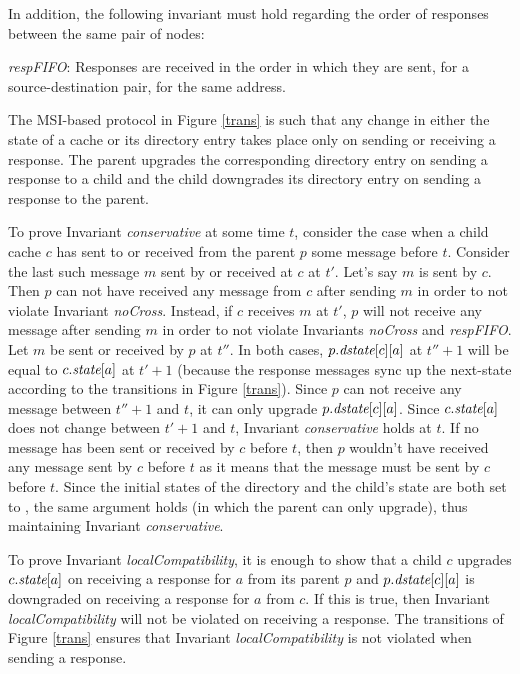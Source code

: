In addition, the following invariant must hold regarding the order of responses
between the same pair of nodes:
\begin{inv}
\textit{respFIFO}: Responses are received in the order in which they are sent,
for a source-destination pair, for the same address.
\end{inv}

The MSI-based protocol in Figure \ref{trans} is such that any change in either
the state of a cache or its directory entry takes place only on sending or
receiving a response. The parent upgrades the corresponding directory entry on
sending a response to a child and the child downgrades its directory entry on
sending a response to the parent.

To prove Invariant \textit{conservative} at some time $t$, consider the case
when a child cache $c$ has sent to or received from the parent $p$ some message
before $t$. Consider the last such message $m$ sent by or received at $c$ at
$t'$. Let's say $m$ is sent by $c$. Then $p$ can not have received any message
from $c$ after sending $m$ in order to not violate Invariant \textit{noCross}.
Instead, if $c$ receives $m$ at $t'$, $p$ will not receive any message after
sending $m$ in order to not violate Invariants \textit{noCross} and
\textit{respFIFO}. Let $m$ be sent or received by $p$ at $t''$. In both cases,
$p.\textit{dstate}[c][a]$ at $t''+1$ will be equal to $c.\textit{state}[a]$ at $t'+1$ (because
the response messages sync up the next-state according to the transitions in
Figure \ref{trans}). Since $p$ can not receive any message between $t''+1$ and
$t$, it can only upgrade $p.\textit{dstate}[c][a]$. Since $c.\textit{state}[a]$ does not change
between $t'+1$ and $t$, Invariant \textit{conservative} holds at $t$. If no
message has been sent or received by $c$ before $t$, then $p$
wouldn't have received any message sent by $c$ before $t$ as it means that the
message must be sent by $c$ before $t$. Since the initial states of the
directory and the child's state are both set to \In{}, the same argument holds
(in which the parent can only upgrade), thus maintaining Invariant
\textit{conservative}.

To prove Invariant \textit{localCompatibility}, it is enough to show that a
child $c$ upgrades $c.\textit{state}[a]$ on receiving a response for $a$ from its
parent $p$ and $p.\textit{dstate}[c][a]$ is downgraded on receiving a response for $a$
from $c$. If this is true, then Invariant \textit{localCompatibility} will not
be violated on receiving a response. The transitions of Figure \ref{trans}
ensures that Invariant \textit{localCompatibility} is not violated when sending
a response.

